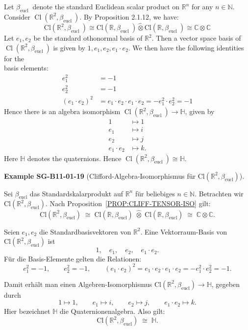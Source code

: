 \documentclass[10pt, letterpaper]{article}
\newcommand{\Cl}{\mathrm{Cl}}
\newcommand{\CustomHeading}[3]{%
  \par\medskip\noindent%
  \textbf{#1 #2} \textnormal{(#3)}.\enskip%
}
\newenvironment{EXA}[2]{\begin{unitbox}\CustomHeading{Example}{#1}{#2}}{\end{unitbox}}
\begin{document}
Let $\beta_{\text {eucl }}$ denote the standard Euclidean scalar product on $\mathbb{R}^{n}$ for any $n \in \mathbb{N}$. Consider $\operatorname{Cl}\left(\mathbb{R}^{2}, \beta_{\text {eucl }}\right)$. By Proposition 2.1.12, we have:
$$
\mathrm{Cl}\left(\mathbb{R}^{2}, \beta_{\text {eucl }}\right) \cong \mathrm{Cl}\left(\mathbb{R}, \beta_{\text {eucl }}\right) \hat{\otimes} \mathrm{Cl}\left(\mathbb{R}, \beta_{\text {eucl }}\right) \cong \mathbb{C} \otimes \mathbb{C}
$$
Let $e_{1}, e_{2}$ be the standard othonormal basis of $\mathbb{R}^{2}$. Then a vector space basis of $\operatorname{Cl}\left(\mathbb{R}^{2}, \beta_{\text {eucl }}\right)$ is given by $1, e_{1}, e_{2}, e_{1} \cdot e_{2}$. We then have the following identities for the\\
basis elements:
$$
\begin{aligned}
e_{1}^{2} & =-1 \\
e_{2}^{2} & =-1 \\
\left(e_{1} \cdot e_{2}\right)^{2} & =e_{1} \cdot e_{2} \cdot e_{1} \cdot e_{2}=-e_{1}^{2} \cdot e_{2}^{2}=-1
\end{aligned}
$$
Hence there is an algebra isomorphism $\operatorname{Cl}\left(\mathbb{R}^{2}, \beta_{\text {eucl }}\right) \rightarrow \mathbb{H}$, given by
$$
\begin{aligned}
1 & \mapsto 1 \\
e_{1} & \mapsto i \\
e_{2} & \mapsto j \\
e_{1} \cdot e_{2} & \mapsto k .
\end{aligned}
$$
Here $\mathbb{H}$ denotes the quaternions. Hence $\operatorname{Cl}\left(\mathbb{R}^{2}, \beta_{\text {eucl }}\right) \cong \mathbb{H}$.



\begin{EXA}{SG-B11-01-19}{Clifford-Algebra-Isomorphismus für \(\Cl(\mathbb{R}^2,\beta_{\mathrm{eucl}})\)}
Sei \(\beta_{\mathrm{eucl}}\) das Standardskalarprodukt auf \(\mathbb{R}^n\) für beliebiges \(n\in\mathbb{N}\).
Betrachten wir \(\Cl(\mathbb{R}^2,\beta_{\mathrm{eucl}})\).
Nach Proposition~\ref{PROP:CLIFF-TENSOR-ISO} gilt:
\[
\Cl(\mathbb{R}^2,\beta_{\mathrm{eucl}})
\;\cong\;
\Cl(\mathbb{R},\beta_{\mathrm{eucl}})\;\hat{\otimes}\;
\Cl(\mathbb{R},\beta_{\mathrm{eucl}})
\;\cong\;
\mathbb{C}\otimes\mathbb{C}.
\]

Seien \(e_{1},e_{2}\) die Standardbasisvektoren von \(\mathbb{R}^{2}\).
Eine Vektorraum-Basis von \(\Cl(\mathbb{R}^2,\beta_{\mathrm{eucl}})\) ist
\[
1,\quad e_{1},\quad e_{2},\quad e_{1}\cdot e_{2}.
\]
Für die Basis-Elemente gelten die Relationen:
\[
e_{1}^{2}=-1,\qquad e_{2}^{2}=-1,\qquad
(e_{1}\cdot e_{2})^{2}=e_{1}\cdot e_{2}\cdot e_{1}\cdot e_{2}
=-e_{1}^{2}\cdot e_{2}^{2}=-1.
\]

Damit erhält man einen Algebren-Isomorphismus
\(\Cl(\mathbb{R}^2,\beta_{\mathrm{eucl}})\to\mathbb{H}\),
gegeben durch
\[
1\mapsto 1,\qquad e_{1}\mapsto i,\qquad e_{2}\mapsto j,\qquad
e_{1}\cdot e_{2}\mapsto k.
\]
Hier bezeichnet \(\mathbb{H}\) die Quaternionenalgebra.
Also gilt:
\[
\boxed{\Cl(\mathbb{R}^2,\beta_{\mathrm{eucl}})\;\cong\;\mathbb{H}.}
\]
\end{EXA}
\end{document}
